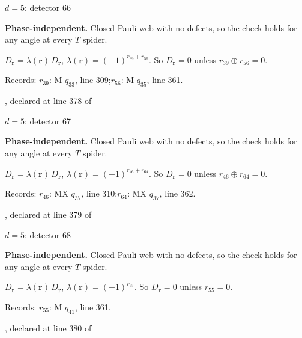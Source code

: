 \label{d5_det066}
{\Large $d=5$: detector 66}\par
\textbf{Phase-independent.} Closed Pauli web with no defects, so the check holds for any angle at every $T$ spider.
\begin{center}
\end{center}
\vspace{-1mm}
$D_{\boldsymbol r}=\lambda(\boldsymbol r)\,D_{\boldsymbol r}$, \quad $\lambda(\boldsymbol r)=(-1)^{r_{39}+r_{56}}$. \qquad So $D_{\boldsymbol r}=0$ unless $r_{39}\oplus r_{56}=0$.
\par\smallskip\begin{minipage}{.98\linewidth}\small Records: $r_{39}$: M $q_{33}$, line 309;\quad $r_{56}$: M $q_{35}$, line 361.\end{minipage}
\vfill
{\footnotesize\texttt{}, declared at line 378 of \texttt{}}
\newpage

\label{d5_det067}
{\Large $d=5$: detector 67}\par
\textbf{Phase-independent.} Closed Pauli web with no defects, so the check holds for any angle at every $T$ spider.
\begin{center}
\end{center}
\vspace{-1mm}
$D_{\boldsymbol r}=\lambda(\boldsymbol r)\,D_{\boldsymbol r}$, \quad $\lambda(\boldsymbol r)=(-1)^{r_{46}+r_{64}}$. \qquad So $D_{\boldsymbol r}=0$ unless $r_{46}\oplus r_{64}=0$.
\par\smallskip\begin{minipage}{.98\linewidth}\small Records: $r_{46}$: MX $q_{37}$, line 310;\quad $r_{64}$: MX $q_{37}$, line 362.\end{minipage}
\vfill
{\footnotesize\texttt{}, declared at line 379 of \texttt{}}
\newpage

\label{d5_det068}
{\Large $d=5$: detector 68}\par
\textbf{Phase-independent.} Closed Pauli web with no defects, so the check holds for any angle at every $T$ spider.
\begin{center}
\end{center}
\vspace{-1mm}
$D_{\boldsymbol r}=\lambda(\boldsymbol r)\,D_{\boldsymbol r}$, \quad $\lambda(\boldsymbol r)=(-1)^{r_{55}}$. \qquad So $D_{\boldsymbol r}=0$ unless $r_{55}=0$.
\par\smallskip\begin{minipage}{.98\linewidth}\small Records: $r_{55}$: M $q_{41}$, line 361.\end{minipage}
\vfill
{\footnotesize\texttt{}, declared at line 380 of \texttt{}}
\newpage


